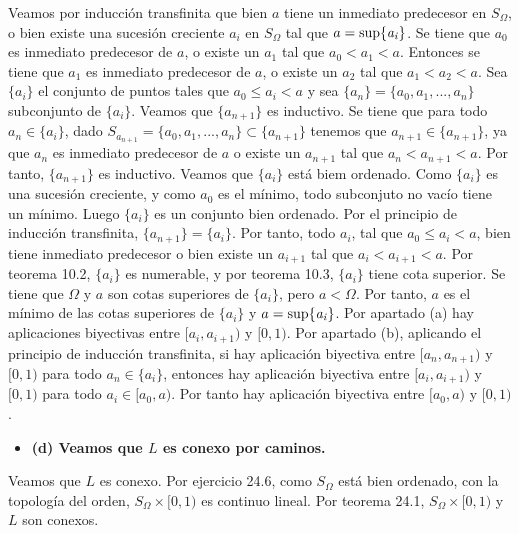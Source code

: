 \documentclass{article}
\begin{document}
Veamos por inducción transfinita que bien $a$ tiene un inmediato predecesor en $S_\Omega$, o bien existe una sucesión creciente $a_i$ en $S_\Omega$ tal que $a=\rm sup \it \{a_i\}$.
Se tiene que $a_0$ es inmediato predecesor de $a$, o existe un $a_1$ tal que $a_0<a_1<a$. Entonces se tiene que $a_1$ es inmediato predecesor de $a$, o existe un $a_2$ tal que $a_1<a_2<a$. Sea $\{a_i\}$ el conjunto de puntos tales que $a_0\leq a_i<a$ y sea $\{a_n\}=\{a_0,a_1,...,a_n\}$ subconjunto de $\{a_i\}$. Veamos que $\{a_{n+1}\}$ es inductivo. Se tiene que para todo $a_n\in \{a_i\}$, dado $S_{a_{n+1}}=\{a_0,a_1,...,a_{n}\}\subset \{a_{n+1}\}$ tenemos que $a_{n+1}\in \{a_{n+1}\}$, ya que $a_{n}$ es inmediato predecesor de $a$ o existe un $a_{n+1}$ tal que $a_{n}<a_{n+1}<a$. Por tanto, $\{a_{n+1}\}$ es inductivo. Veamos que $\{a_i\}$ está biem ordenado. Como $\{a_i\}$ es una sucesión creciente, y como $a_0$ es el mínimo, todo subconjuto no vacío tiene un mínimo. Luego $\{a_i\}$ es un conjunto bien ordenado. Por el principio de inducción transfinita, $\{a_{n+1}\}=\{a_i\}$. Por tanto, todo $a_i$, tal que $a_0\leq a_i<a$, bien tiene inmediato predecesor o bien existe un $a_{i+1}$ tal que $a_i<a_{i+1}<a$. Por teorema 10.2, $\{a_i\}$ es numerable, y por teorema 10.3, $\{a_i\}$ tiene cota superior. Se tiene que $\Omega$ y $a$ son cotas superiores de $\{a_i\}$, pero $a<\Omega$. Por tanto, $a$ es el mínimo de las cotas superiores de $\{a_i\}$ y $a=\rm sup \it \{a_i\}$. Por apartado (a) hay aplicaciones biyectivas entre $[a_i,a_{i+1})$ y $[0,1)$. Por apartado (b), aplicando el principio de inducción transfinita, si hay aplicación biyectiva entre $[a_n,a_{n+1})$ y $[0,1)$ para todo $a_n\in \{a_i\}$, entonces hay aplicación biyectiva entre $[a_i,a_{i+1})$ y $[0,1)$ para todo $a_i \in [a_0,a)$. Por tanto hay aplicación biyectiva entre $[a_0,a)$ y $[0,1)$.
\begin{itemize}
\item \bf (d) \rm Veamos que $L$ es conexo por caminos.
\end{itemize}
Veamos que $L$ es conexo. Por ejercicio 24.6, como $S_\Omega$ está bien ordenado, con la topología del orden, $S_\Omega\times [0,1)$ es continuo lineal. Por teorema 24.1, $S_\Omega\times [0,1)$ y $L$ son conexos.
\end{document}
